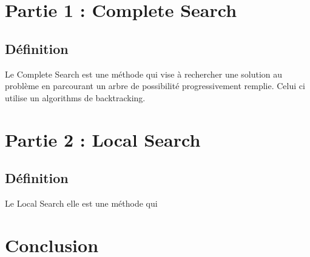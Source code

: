 \documentclass{article}
\begin{document}
\vspace{1cm}
\section{Partie 1 : Complete Search}
\vspace{2cm}

\subsection {Définition}

Le Complete Search est une méthode qui vise à rechercher une solution au problème en parcourant un arbre de possibilité progressivement remplie.
Celui ci utilise un algorithms de backtracking.

\subsection{}



\vspace{1cm}
\section{Partie 2 : Local Search}
\vspace{2cm}

\subsection {Définition}

Le Local Search elle est une méthode qui 

\subsection {}


\vspace{1cm}
\section{Conclusion}
\vspace{2cm}
\end{document}
